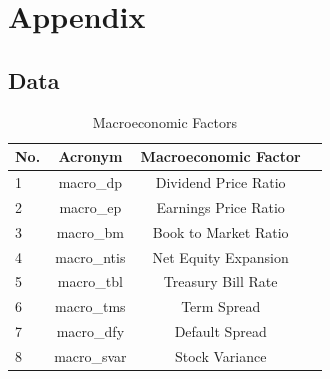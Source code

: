 \documentclass[11pt, a4paper, table]{article}
\begin{document}
\newpage

\section{Appendix}

\subsection{Data}


\begin{table}[!htb]
	\caption{Macroeconomic Factors}
	\begin{center}
		\begin{tabular}{lccc} \hline
			No. & Acronym & Macroeconomic Factor \\ \hline
			1 & macro\_dp & Dividend Price Ratio \\
			2 & macro\_ep & Earnings Price Ratio \\
			3 & macro\_bm & Book to Market Ratio \\
			4 & macro\_ntis & Net Equity Expansion \\
			5 & macro\_tbl & Treasury Bill Rate \\
			6 & macro\_tms & Term Spread \\
			7 & macro\_dfy & Default Spread \\
			8 & macro\_svar & Stock Variance \\ \hline
		\end{tabular}
	\end{center}
\end{table}

\end{document}
